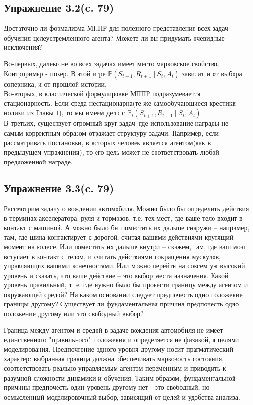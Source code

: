 \subsection{Упражнение 3.2(c. 79)}
Достаточно ли формализма МППР для полезного представления
всех задач обучения целеустремленного агента? Можете ли вы придумать очевидные исключения? 
\begin{solution}
    Во-первых, далеко не во всех задачах имеет место марковское свойство. Контрпример - покер. В этой игре $\mathbb{P}(S_{t+1}, R_{t+1} \mid S_t, A_t)$ зависит и от выбора соперника, и от прошлой истории.\\
    Во-вторых, в классической формулировке МППР подразумевается стационарность. Если среда нестационарна(те же самообучающиеся крестики-нолики из Главы $1$), то мы имеем дело с $\mathbb{P}_t(S_{t+1}, R_{t+1} \mid S_t, A_t)$. \\
    В-третьих, существует огромный круг задач, где использование награды не самым корректным образом отражает структуру задачи. Например, если рассматривать постановки, в которых человек является агентом(как в предыдущем упражнении), то его цель может не соответствовать любой предложенной награде.
\end{solution}

\subsection{Упражнение 3.3(c. 79)}
Рассмотрим задачу о  вождении автомобиля. Можно было бы
определить действия в терминах акселератора, руля и тормозов, т.е. тех мест, где ваше тело входит в контакт с машиной. А можно было бы поместить их дальше снаружи – например, там, где шина контактирует с дорогой, считая вашими действиями крутящий момент на колесе. Или поместить их дальше внутри – скажем, там, где ваш мозг вступает в контакт с телом, и считать действиями сокращения
мускулов, управляющих вашими конечностями. Или можно перейти на совсем уж высокий уровень и сказать, что ваше действие – это выбор места назначения. Какой уровень правильный, т. е. где нужно было бы провести границу между агентом и окружающей средой? На каком основании следует предпочесть одно положение границы другому? Существует ли фундаментальная причина предпочесть одно положение другому или это свободный выбор?
\begin{solution}
    Граница между агентом и средой в задаче вождения автомобиля не имеет единственного "правильного"\ положения и определяется не физикой, а целями моделирования. Предпочтение одного уровня другому носит прагматический характер: выбранная граница должна обеспечивать марковость состояния, соответствовать реально управляемым агентом переменным и приводить к разумной сложности динамики и обучения. Таким образом, фундаментальной причины предпочесть один уровень другому нет - это свободный, но осмысленный моделировочный выбор, зависящий от целей и удобства анализа.
\end{solution}

